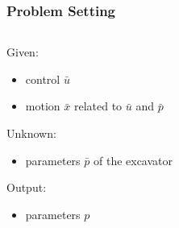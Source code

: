 \begin{frame}
    \frametitle{Problem Setting}
	\begin{columns}
	    
    
    \begin{column}{0.5\textwidth}
    Given:
    \begin{itemize}
        \item{control $\bar{u}$}
        \item{motion $\bar{x}$ related to $\bar{u}$ and $\bar{p}$}
    \end{itemize}

    Unknown:
    \begin{itemize}
        \item{parameters $\bar{p}$ of the excavator}
    \end{itemize}

    Output:
    \begin{itemize}
        \item{parameters $p$}
    \end{itemize}
    \end{column}
    
    \begin{column}{0.4\textwidth}


\end{column}    
    
    
    
    \end{columns}
\end{frame}

%

